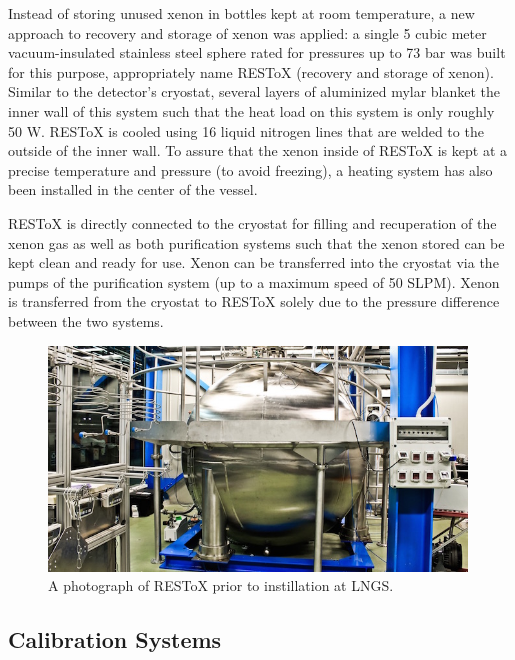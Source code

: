  Instead of storing unused xenon in bottles kept at room temperature, a new approach to recovery and storage of xenon was applied: a single 5 cubic meter vacuum-insulated stainless steel sphere rated for pressures up to 73 bar was built for this purpose, appropriately name RESToX (recovery and storage of xenon).  Similar to the detector's cryostat, several layers of aluminized mylar blanket the inner wall of this system such that the heat load on this system is only roughly 50 W.  RESToX is cooled using 16 liquid nitrogen lines that are welded to the outside of the inner wall.  To assure that the xenon inside of RESToX is kept at a precise temperature and pressure (to avoid freezing), a heating system has also been installed in the center of the vessel.
 
 RESToX is directly connected to the cryostat for filling and recuperation of the xenon gas as well as both purification systems such that the xenon stored can be kept clean and ready for use.  Xenon can be transferred into the cryostat via the pumps of the purification system (up to a maximum speed of 50 SLPM). Xenon is transferred from the cryostat to RESToX solely due to the pressure difference between the two systems.
 
 \begin{figure}[t]
	\centering
	\includegraphics[width=0.99\textwidth]{xe1t_restox}
	\caption{A photograph of RESToX prior to instillation at LNGS.}
	\label{fig:xe1t_restox}
\end{figure}


  \subsection{Calibration Systems}
 \label{sec:xe1t_calibration_system}
 
